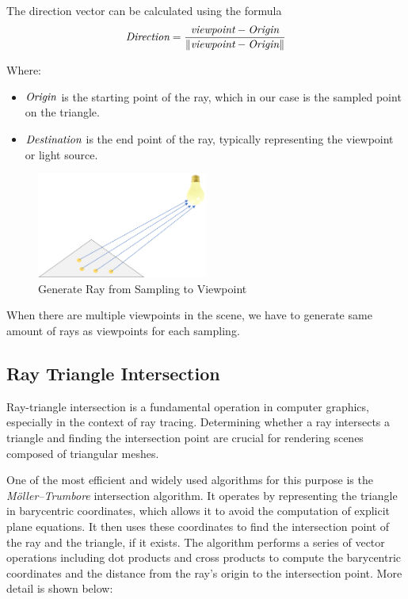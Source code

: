 \documentclass[11pt, a4paper,oneside,chapterprefix=false]{scrbook}
\begin{document}
\vspace{10pt}

The direction vector can be calculated using the formula 
\[
\emph{Direction} = \frac{\emph{viewpoint} - \emph{Origin}}{\|\emph{viewpoint} - \emph{Origin}\|}
\]

Where:
\begin{itemize}
    \item \(\emph{Origin}\) is the starting point of the ray, which in our case is the sampled point on the triangle.
    \item \(\emph{Destination}\) is the end point of the ray, typically representing the viewpoint or light source.
\end{itemize}

\begin{figure}[H]
    \centering
    \includegraphics*[width=0.5\textwidth]{figures/sample to vp.png}
    \caption{Generate Ray from Sampling to Viewpoint}
    \label{fig:generate ray from sampling to viewpoint}
\end{figure}

When there are multiple viewpoints in the scene, we have to generate same amount of rays as viewpoints for each sampling.  

\subsection{Ray Triangle Intersection}

Ray-triangle intersection is a fundamental operation in computer graphics, especially in the context of ray tracing. Determining whether a ray intersects a triangle and finding the intersection point are crucial for rendering scenes composed of triangular meshes.
\vspace{10pt}

One of the most efficient and widely used algorithms for this purpose is the \emph{Möller–Trumbore} intersection algorithm. It operates by representing the triangle in barycentric coordinates, which allows it to avoid the computation of explicit plane equations. It then uses these coordinates to find the intersection point of the ray and the triangle, if it exists. The algorithm performs a series of vector operations including dot products and cross products to compute the barycentric coordinates and the distance from the ray's origin to the intersection point. More detail is shown below:
\end{document}
